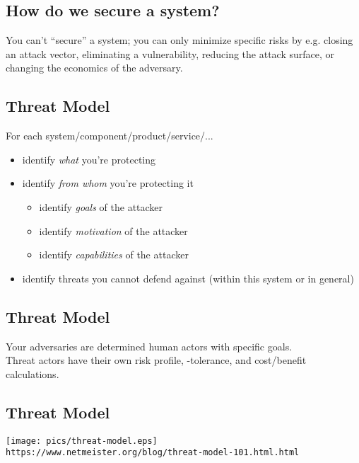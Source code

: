 \documentclass[xga]{xdvislides}
\begin{document}
\subsection{How do we secure a system?}
\vspace*{\fill}
\Huge
\begin{center}
You can't ``secure'' a system; you can only minimize
specific risks by e.g. closing an attack vector,
eliminating a vulnerability, reducing the attack
surface, or changing the economics of the adversary.
\end{center}
\Normalsize
\vspace*{\fill}


\subsection{Threat Model}
For each system/component/product/service/...

\begin{itemize}
	\item identify {\em what} you're protecting
	\item identify {\em from whom} you're protecting it
		\begin{itemize}
			\item identify {\em goals} of the attacker
			\item identify {\em motivation} of the attacker
			\item identify {\em capabilities} of the attacker
		\end{itemize}
	\item identify threats you cannot defend against (within this
		system or in general)
\end{itemize}

\subsection{Threat Model}
\vspace*{\fill}
\Huge
\begin{center}
Your adversaries are determined human actors with
specific goals. \\
\addvspace{.5in}
Threat actors have their own risk profile, -tolerance, and cost/benefit calculations.
\end{center}
\Normalsize
\vspace*{\fill}

\subsection{Threat Model}
\vspace*{\fill}
\begin{center}
	\texttt{[image: pics/threat-model.eps]} \\
\vspace{.2in}
\small
	\verb+https://www.netmeister.org/blog/threat-model-101.html.html+
\end{center}
\Normalsize
\vspace*{\fill}
\end{document}
